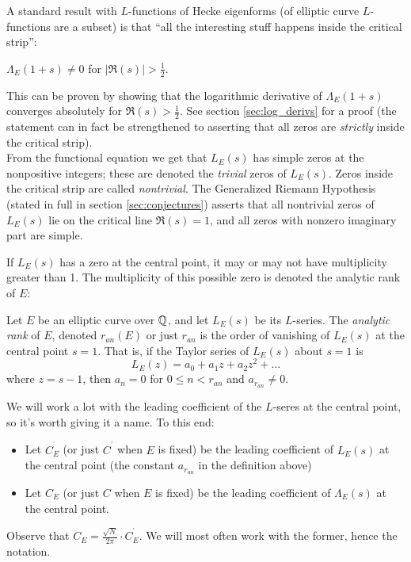 \documentclass[10pt]{article}
\newcommand{\pr}{^{\prime}}
\newcommand{\Les}{L_E(s)}
\newcommand{\Lams}{\Lambda_E(s)}
\begin{document}
A standard result with $L$-functions of Hecke eigenforms (of elliptic curve $L$-functions are a subset) is that ``all the interesting stuff happens inside the critical strip'':
\begin{proposition}
$\Lambda_E(1+s) \ne 0$ for $|\Re(s)| > \frac{1}{2}$.
\end{proposition}
This can be proven by showing that the logarithmic derivative of $\Lambda_E(1+s)$ converges absolutely for $\Re(s) > \frac{1}{2}$. See section \ref{sec:log_derivs} for a proof (the statement can in fact be strengthened to asserting that all zeros are {\it strictly} inside the critical strip). \\

From the functional equation we get that $\Les$ has simple zeros at the nonpositive integers; these are denoted the {\it trivial} zeros of $\Les$. Zeros inside the critical strip are called {\it nontrivial}. The Generalized Riemann Hypothesis (stated in full in section \ref{sec:conjectures}) asserts that all nontrivial zeros of $\Les$ lie on the critical line $\Re(s)=1$, and all zeros with nonzero imaginary part are simple. 

If $\Les$ has a zero at the central point, it may or may not have multiplicity greater than 1. The multiplicity of this possible zero is denoted the analytic rank of $E$:
\begin{definition}
Let $E$ be an elliptic curve over $\mathbb{Q}$, and let $\Les$ be its $L$-series. The {\it analytic rank} of $E$, denoted $r_{an}(E)$ or just $r_{an}$ is the order of vanishing of $L_E(s)$ at the central point $s=1$. That is, if the Taylor series of $\Les$ about $s=1$ is
\begin{equation}
L_E(z) = a_0 + a_1 z + a_2 z^2 + \ldots
\end{equation}
where $z = s-1$, then $a_n = 0$ for $0 \le n < r_{an}$ and $a_{r_{an}} \ne 0$.
\end{definition}
We will work a lot with the leading coefficient of the $L$-seres at the central point, so it's worth giving it a name. To this end:
\begin{definition} \mbox{}
\begin{itemize}
\item Let $C^{\pr}_E$ (or just $C^{\pr}$ when $E$ is fixed) be the leading coefficient of $L_E(s)$ at the central point (the constant $a_{r_{an}}$ in the definition above)
\item Let $C_E$ (or just $C$ when $E$ is fixed) be the leading coefficient of $\Lams$ at the central point.
\end{itemize}
\end{definition}
Observe that $C_E = \frac{\sqrt{N}}{2\pi}\cdot C^{\pr}_E$. We will most often work with the former, hence the notation.
\end{document}

